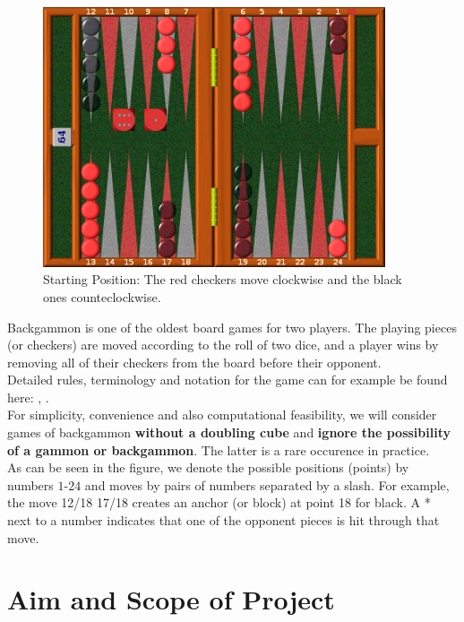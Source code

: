 \documentclass[11pt, a4paper, twoside]{amsart} %
\theoremstyle{definition}
\begin{document}
\text{} \newline
\begin{minipage}{0.4\textwidth}
\begin{figure}[H]
\includegraphics[width=0.9\textwidth]{StartingPosition}
Starting Position: The red checkers move clockwise and the black ones counteclockwise.
\end{figure}
\end{minipage}  
\begin{minipage}{0.6\textwidth}
Backgammon is one of the oldest board games for two players. The playing pieces (or checkers) are moved according to the roll of two dice, and a player wins by removing all of their checkers from the board before their opponent.\\
Detailed rules, terminology and notation for the game can for example be found here: \citep{WikiBG}, \citep{WikiN}.\\
For simplicity, convenience and also computational feasibility, we will consider games of backgammon \textbf{without a doubling cube} and \textbf{ignore the possibility of a gammon or backgammon}. The latter is a rare occurence in practice.\\
As can be seen in the figure, we denote the possible positions (points) by numbers $1$-$24$ and moves by pairs of numbers separated by a slash. For example, the move 12/18 17/18 creates an anchor (or block) at point 18 for black. A * next to a number indicates that one of the opponent pieces is hit through that move.
\end{minipage}



\section{Aim and Scope of Project}
\end{document}
